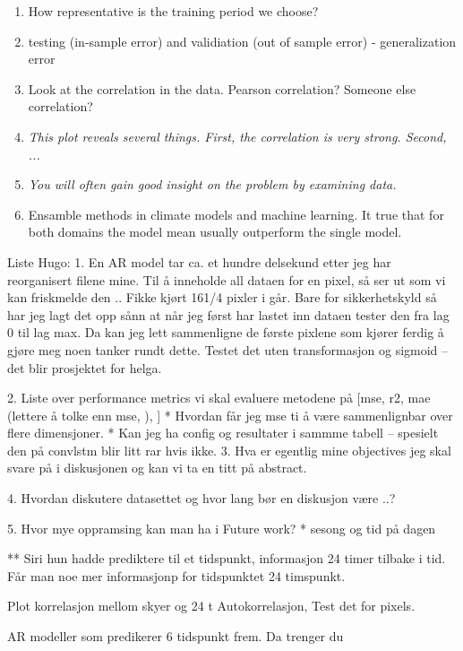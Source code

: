 \begin{enumerate}
    \item How representative is the training period we choose?
    \item testing (in-sample error) and validiation (out of sample error) - generalization error 
    \item Look at the correlation in the data. Pearson correlation? Someone else correlation?
    \item \textit{This plot reveals several things. First, the correlation is very strong. Second, ... }
    \item \textit{You will often gain good insight on the problem by examining data.}
    \item Ensamble methods in climate models and machine learning. It true that for both domains the model mean usually outperform the single model.
\end{enumerate}

Liste Hugo:
1. En AR model tar ca. et hundre delsekund etter jeg har reorganisert filene mine. Til å inneholde all dataen for en pixel, så ser ut som vi kan friskmelde den .. Fikke kjørt 161/4 pixler i går. Bare for sikkerhetskyld så har jeg lagt det opp sånn at når jeg først har lastet inn dataen tester den fra lag 0 til lag max. Da kan jeg lett sammenligne de første pixlene som kjører ferdig å gjøre meg noen tanker rundt dette. Testet det uten transformasjon og sigmoid -- det blir prosjektet for helga. 

2. Liste over performance metrics vi skal evaluere metodene på [mse, r2, mae (lettere å tolke enn mse, ), ]
    * Hvordan får jeg mse ti å være sammenlignbar over flere dimensjoner. 
    * Kan jeg ha config og resultater i sammme tabell -- spesielt den på convlstm blir litt rar hvis ikke. 
3. Hva er egentlig mine objectives jeg skal svare på i diskusjonen og kan vi ta en titt på abstract. 

4. Hvordan diskutere datasettet og hvor lang bør en diskusjon være ..?

5. Hvor mye oppramsing kan man ha i Future work?
    * sesong og tid på dagen 

** Siri hun hadde prediktere til et tidspunkt, informasjon 24 timer tilbake i tid.
Får man noe mer informasjonp for tidspunktet 24 timspunkt.

Plot korrelasjon mellom skyer og 24 t 
Autokorrelasjon, Test det for pixels. 

AR modeller som predikerer 6 tidspunkt frem. Da trenger du 


